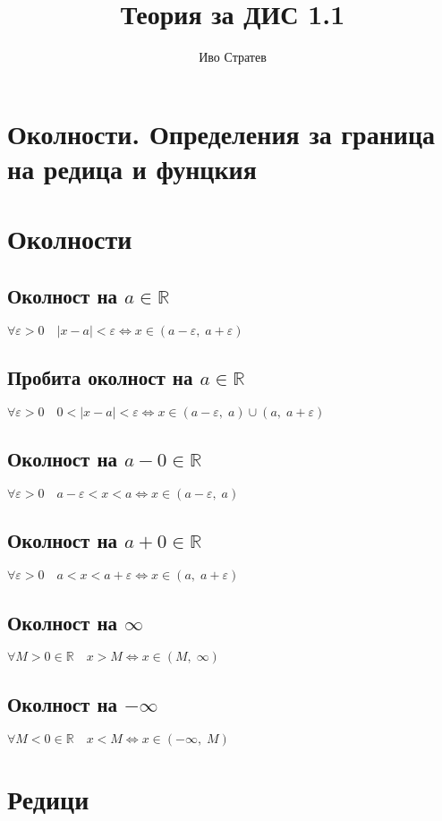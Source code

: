 \documentclass[12pt]{article}
\title{Теория за ДИС 1.1}
\author{Иво Стратев}
\newcommand{\R}{\mathbb{R}}
\newcommand{\spc}{\quad}
\newcommand{\e}{\varepsilon}
\begin{document}
\maketitle

\section*{Околности. Определения за граница на редица и фунцкия}

\section*{Околности}

\subsection*{Околност на \(a \in \R\)}
\(\forall \e > 0 \quad |x - a| < \e \iff x \in (a - \e, \; a + \e)\)

\subsection*{Пробита околност на \(a \in \R\)}
\(\forall \e > 0 \quad 0 < |x - a| < \e \iff x \in (a - \e, \; a) \cup (a, \; a + \e)\)

\subsection*{Околност на \(a - 0 \in \R\)}
\(\forall \e > 0 \quad a - \e < x < a \iff x \in (a - \e, \; a)\)

\subsection*{Околност на \(a + 0 \in \R\)}
\(\forall \e > 0 \quad a < x < a + \e \iff x \in (a, \; a + \e)\)

\subsection*{Околност на \(\infty\)}
\(\forall M > 0 \in \R \spc x > M \iff x \in (M,\; \infty)\)

\subsection*{Околност на \(-\infty\)}
\(\forall M < 0 \in \R \spc x < M \iff x \in (-\infty,\; M)\)

\section*{Редици}
\end{document}
